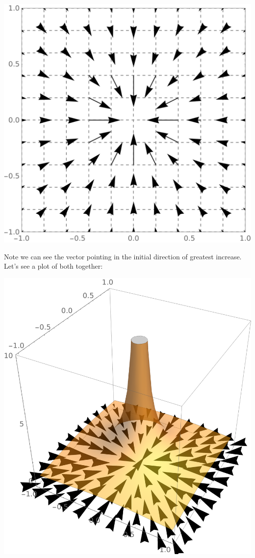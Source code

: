 \documentclass{ximera}
\begin{document}
\begin{example}
\begin{image}
    \includegraphics{gradField2.png}
  \end{image}
  Note we can see the vector pointing in the initial direction of
  greatest increase. Let's see a plot of both together:
  \begin{image}
    \includegraphics{gradSurf2.png}
  \end{image}
\end{example}
\end{document}
